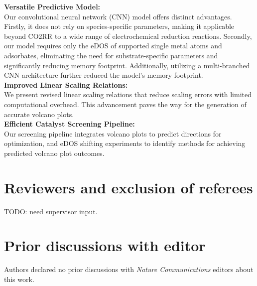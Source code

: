 \documentclass[a4paper, 12pt]{article}
\begin{document}
\noindent \textbf{Versatile Predictive Model:} \\
    Our convolutional neural network (CNN) model offers distinct advantages.
    Firstly, it does not rely on species-specific parameters,
    making it applicable beyond CO2RR to a wide range of electrochemical reduction reactions.
    Secondly, our model requires only the eDOS of supported single metal atoms and adsorbates,
    eliminating the need for substrate-specific parameters
    and significantly reducing memory footprint.
    Additionally, utilizing a multi-branched CNN architecture further reduced
    the model's memory footprint. \\

\noindent \textbf{Improved Linear Scaling Relations:} \\
    We present revised linear scaling relations that reduce scaling errors
    with limited computational overhead.
    This advancement paves the way for the generation of accurate volcano plots. \\

\noindent \textbf{Efficient Catalyst Screening Pipeline:} \\
    Our screening pipeline integrates volcano plots to predict directions
    for optimization, and eDOS shifting experiments to identify methods
    for achieving predicted volcano plot outcomes.


\section{Reviewers and exclusion of referees}

TODO: need supervisor input.

\section{Prior discussions with editor}

Authors declared no prior discussions with \textit{Nature Communications} editors about this work.
\end{document}
